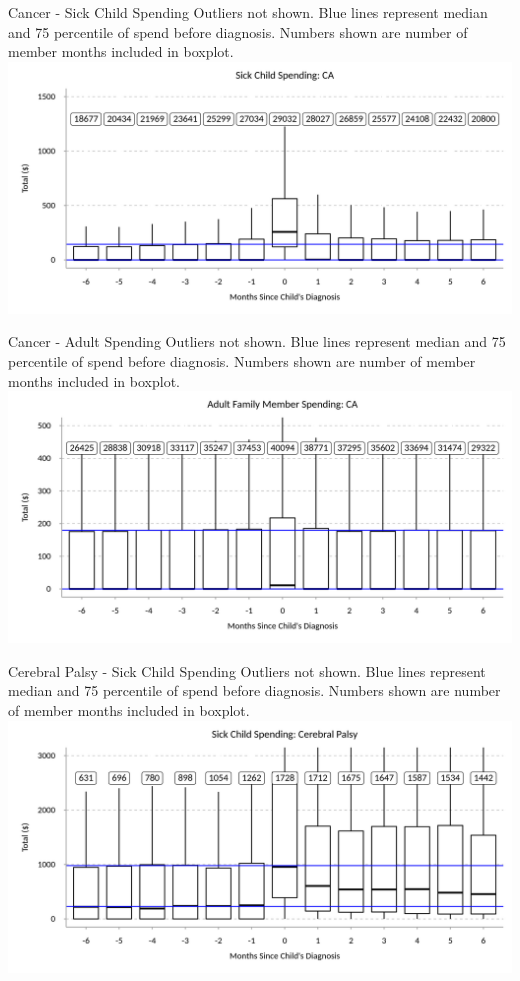 \documentclass[xcolor=x11names,compress]{beamer}
\renewcommand{\(}{\begin{columns}}
\renewcommand{\)}{\end{columns}}
\newcommand{\<}[1]{\begin{column}{#1}}
\renewcommand{\>}{\end{column}}
\begin{document}
\begin{frame}{Cancer - Sick Child Spending}
\small
Outliers not shown. Blue lines represent median and 75 percentile of spend before diagnosis. Numbers
shown are number of member months included in boxplot. 
\includegraphics[width=\linewidth]{../figures/sick_child_spend_CA.png}
\end{frame}

\begin{frame}{Cancer - Adult Spending}
\small
Outliers not shown. Blue lines represent median and 75 percentile of spend before diagnosis. Numbers
shown are number of member months included in boxplot. 
\includegraphics[width=\linewidth]{../figures/adult_family_spend_CA.png}
\end{frame}

\begin{frame}{Cerebral Palsy - Sick Child Spending}
\small
Outliers not shown. Blue lines represent median and 75 percentile of spend before diagnosis. Numbers
shown are number of member months included in boxplot. 
\includegraphics[width=\linewidth]{../figures/sick_child_spend_cerebral.png}
\end{frame}
\end{document}
